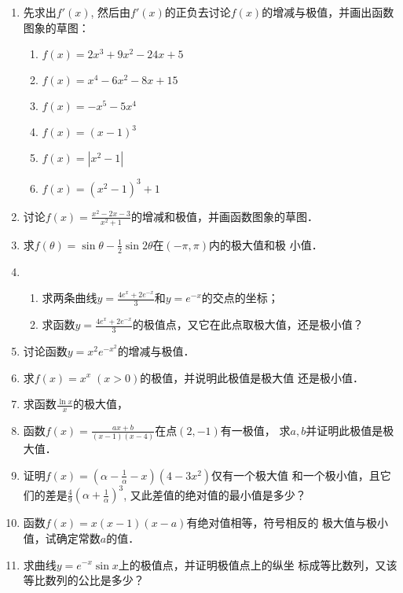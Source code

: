 \begin{ex}
\begin{enumerate}
    \item 先求出$f'(x)$, 然后由$f'(x)$的正负去讨论$f(x)$的增减与极值，并画出函数图象的草图：
\begin{multicols}{2}
    \begin{enumerate}
        \item $f (x) =2x^3+9x^2-24x+5$
        \item $f (x) =x^4-6x^2-8x+15$
        \item $f (x) =-x^5-5x^4$
        \item $f (x) = (x-1)^3$
     \item  $f (x) =|x^2-1|$
     \item $f (x) = (x^2-1)^3+1$
    \end{enumerate}
\end{multicols}
\item 讨论$f(x)=\frac{x^2-2x-3}{x^2+1}$的增减和极值，并画函数图象的草图．
    \item 求$f(\theta)=\sin\theta-\frac{1}{2}\sin2\theta$在$(-\pi,\pi)$内的极大值和极
    小值．
    \item 
\begin{enumerate}
    \item 求两条曲线$y=\frac{4e^x+2e^{-x}}{3}$和$y=e^{-x}$的交点的坐标；
    \item 求函数$y=\frac{4e^x+2e^{-x}}{3}$的极值点，又它在此点取极大值，还是极小值？
\end{enumerate}

\item 讨论函数$y=x^2e^{-x^2}$的增减与极值．
\item 求$f(x)=x^x\; (x>0)$的极值，并说明此极值是极大值
还是极小值．
\item 求函数$\frac{\ln x}{x}$的极大值，

\item 函数$f(x)=\frac{ax+b}{(x-1)(x-4)}$在点$(2,-1)$有一极值，
求$a,b$并证明此极值是极大值．
\item 证明$f(x)=\left(\alpha-\frac{1}{\alpha}-x\right)(4-3x^2)$仅有一个极大值
和一个极小值，且它们的差是$\frac{4}{9}\left(\alpha+\frac{1}{\alpha}\right)^3$, 又此差值的绝对值的最小值是多少？
\item 函数$f(x)=x(x-1)(x-a)$有绝对值相等，符号相反的
极大值与极小值，试确定常数$a$的值．
\item 求曲线$y=e^{-x}\sin x$上的极值点，并证明极值点上的纵坐
标成等比数列，又该等比数列的公比是多少？  
\end{enumerate} 
\end{ex}


